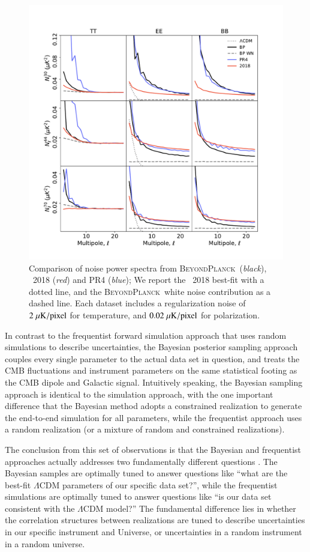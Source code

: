 \documentclass[twocolumn]{aa}
\newcommand{\BP}{\textsc{BeyondPlanck}}
\begin{document}
\begin{figure}
	\center
	\includegraphics[width=\linewidth]{figs/noise_ps_var1.pdf}
	\caption{Comparison of noise power spectra from  \BP\
	(\emph{black}), \Planck\ 2018 (\emph{red}) and PR4 (\emph{blue});
	We report the \Planck\ 2018 best-fit with a dotted line, and 
	the \BP\ white noise contribution as a dashed line. Each dataset
	includes a regularization noise of $2\;\mu\rm{K}/\rm{pixel}$
	for temperature, and $0.02\;\mu\rm{K}/\rm{pixel}$ for 
	polarization.}
	\label{fig:noise_ps}
\end{figure}

In contrast to the frequentist forward simulation approach that uses
random simulations to describe uncertainties, the Bayesian posterior
sampling approach couples every single parameter to the actual data
set in question, and treats the CMB fluctuations and instrument
parameters on the same statistical footing as the CMB dipole and
Galactic signal. Intuitively speaking, the Bayesian sampling approach
is identical to the simulation approach, with the one important
difference that the Bayesian method adopts a constrained realization
to generate the end-to-end simulation for all parameters, while the
frequentist approach uses a random realization (or a mixture of random
and constrained realizations).

The conclusion from this set of observations is that the Bayesian and
frequentist approaches actually addresses two fundamentally different
questions \citep{bp04}. The Bayesian samples are optimally tuned to
answer questions like ``what are the best-fit $\Lambda$CDM parameters
of our specific data set?'', while the frequentist simulations are
optimally tuned to answer questions like ``is our data set consistent
with the $\Lambda$CDM model?'' The fundamental difference lies in
whether the correlation structures between realizations are tuned to
describe uncertainties in our specific instrument and Universe, or
uncertainties in a random instrument in a random universe.
\end{document}
